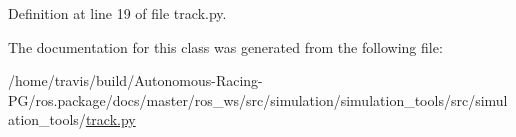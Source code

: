 Definition at line 19 of file track.\+py.



The documentation for this class was generated from the following file\+:\begin{DoxyCompactItemize}
\item 
/home/travis/build/\+Autonomous-\/\+Racing-\/\+P\+G/ros.\+package/docs/master/ros\+\_\+ws/src/simulation/simulation\+\_\+tools/src/simulation\+\_\+tools/\hyperlink{track_8py}{track.\+py}\end{DoxyCompactItemize}
